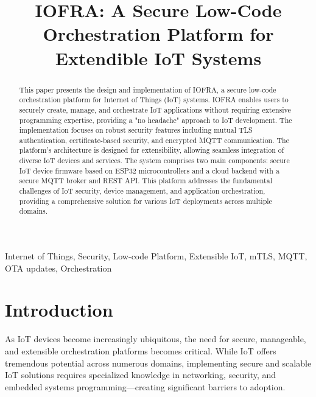 \documentclass[conference]{IEEEtran}
\begin{document}
\title{IOFRA: A Secure Low-Code Orchestration Platform for Extendible IoT Systems}

\author{
}

\maketitle

\begin{abstract}
This paper presents the design and implementation of IOFRA, a secure low-code orchestration platform for Internet of Things (IoT) systems. IOFRA enables users to securely create, manage, and orchestrate IoT applications without requiring extensive programming expertise, providing a "no headache" approach to IoT development. The implementation focuses on robust security features including mutual TLS authentication, certificate-based security, and encrypted MQTT communication. The platform's architecture is designed for extensibility, allowing seamless integration of diverse IoT devices and services. The system comprises two main components: secure IoT device firmware based on ESP32 microcontrollers and a cloud backend with a secure MQTT broker and REST API. This platform addresses the fundamental challenges of IoT security, device management, and application orchestration, providing a comprehensive solution for various IoT deployments across multiple domains.
\end{abstract}

\begin{IEEEkeywords}
Internet of Things, Security, Low-code Platform, Extensible IoT, mTLS, MQTT, OTA updates, Orchestration
\end{IEEEkeywords}

\section{Introduction}
As IoT devices become increasingly ubiquitous, the need for secure, manageable, and extensible orchestration platforms becomes critical. While IoT offers tremendous potential across numerous domains, implementing secure and scalable IoT solutions requires specialized knowledge in networking, security, and embedded systems programming—creating significant barriers to adoption.
\end{document}
